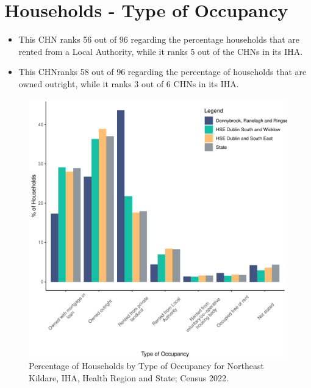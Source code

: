 \documentclass{article}
\begin{document}
\section{Households - Type of Occupancy}\label{sect:Households}
\begin{itemize}
\item This CHN ranks  56 out of 96 regarding the percentage households that are rented from a Local Authority, while it ranks  5 out of the CHNs in its IHA. 
\item This CHNranks  58 out of 96 regarding the percentage of households that are owned outright, while it ranks   3 out of 6 CHNs in its IHA.
\end{itemize}
\begin{figure}[H]
	\centering
	\includegraphics[width = 140mm]{../figures/HouseholdsED.pdf}
	\caption{Percentage of Households by Type of Occupancy for Northeast Kildare, IHA, Health Region and State; Census 2022.}
	\label{fig:vbnv}
	\end{figure}
\end{document}
